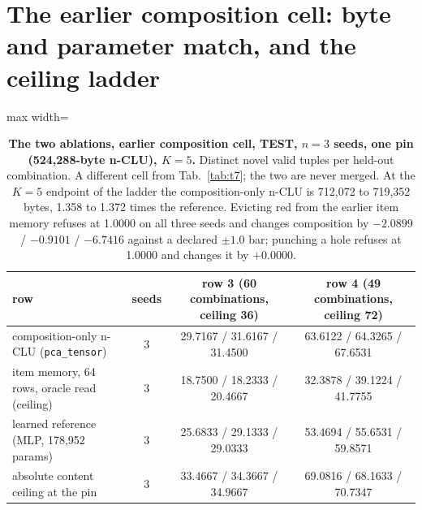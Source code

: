 \documentclass{article} %
\begin{document}
\section{The earlier composition cell: byte and parameter match, and the ceiling ladder}
\label{app:w5}

\begin{table}[h]
\centering\small
\caption{\textbf{The two ablations, earlier composition cell, TEST, $n=3$ seeds, one pin
(524,288-byte n-CLU), $K=5$.} Distinct novel valid tuples per held-out combination. A different cell from %
Tab.~\ref{tab:t7}; the two are never merged. At the $K=5$ endpoint of the ladder the composition-only n-CLU is %
712,072 to 719,352 bytes, 1.358 to 1.372 times the reference. Evicting red from the earlier item memory %
refuses at 1.0000 on all three seeds and changes composition by $-2.0899$ / $-0.9101$ / $-6.7416$ against a %
declared $\pm1.0$ bar; punching a hole refuses at 1.0000 and changes it by $+0.0000$.} %
\label{tab:ablations}
\setlength{\tabcolsep}{3pt}
\begin{adjustbox}{max width=\linewidth}\begin{tabular}{lccc}
\toprule
row & seeds & row 3 (60 combinations, ceiling 36) & row 4 (49 combinations, ceiling 72) \\ %
\midrule
composition-only n-CLU (\texttt{pca\_tensor}) & 3 & 29.7167 / 31.6167 / 31.4500 & 63.6122 / 64.3265 / 67.6531 \\
item memory, 64 rows, oracle read (ceiling) & 3 & 18.7500 / 18.2333 / 20.4667 & 32.3878 / 39.1224 / 41.7755 \\
learned reference (MLP, 178,952 params) & 3 & 25.6833 / 29.1333 / 29.0333 & 53.4694 / 55.6531 / 59.8571 \\
absolute content ceiling at the pin & 3 & 33.4667 / 34.3667 / 34.9667 & 69.0816 / 68.1633 / 70.7347 \\
\bottomrule
\end{tabular}\end{adjustbox}
\end{table}
\end{document}
